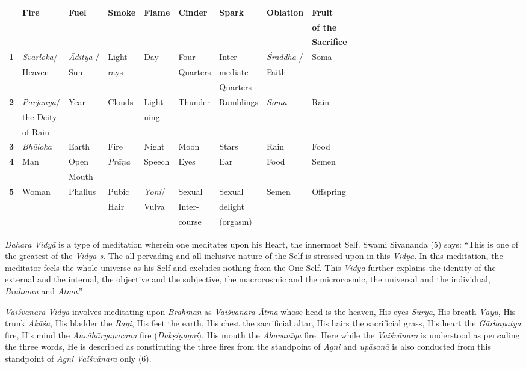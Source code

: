\small\addtolength{\tabcolsep}{-5pt}
\begin{longtable}{|l|l|l|l|l|l|l|l|l|}
\hline
 & \textbf{Fire} & \textbf{Fuel} & \textbf{Smoke} & \textbf{Flame} & \textbf{Cinder} & \textbf{Spark} & \textbf{Oblation} & \textbf{Fruit}\tabularnewline
 & & & & & & & &\textbf{of the}\tabularnewline
 & & & & & & & &\textbf{Sacrifice}\tabularnewline
\hline
\textbf{1} & \emph{Svarloka}/ & \emph{Āditya} / & Light- & Day & Four- & Inter- & \emph{Śraddhā} /  & Soma\tabularnewline
& Heaven & Sun & rays & & Quarters & mediate & Faith &\tabularnewline
&  &  &  & &  & Quarters &  &\tabularnewline
\hline
\textbf{2} & \emph{Parjanya}/ & Year & Clouds & Light- & Thunder & Rumblings & \emph{Soma} & Rain\tabularnewline
& the Deity &  &  & ning &  &  &  &\tabularnewline
& of Rain &  &  &  &  &  &  & \tabularnewline
\hline
\textbf{3} & \emph{Bhūloka} & Earth & Fire & Night & Moon & Stars & Rain & Food\tabularnewline
\hline
\textbf{4} & Man & Open & \emph{Prāṇa} & Speech & Eyes & Ear & Food & Semen\tabularnewline
& & Mouth &  &  &  &  &  &\tabularnewline
\hline
\textbf{5} & Woman & Phallus & Pubic & \emph{Yoni}/ & Sexual & Sexual  & Semen & Offspring\tabularnewline
&  &  & Hair & Vulva & Inter- & delight &  &\tabularnewline
& &  &  &  & course & (orgasm) &  &\tabularnewline
\hline
\end{longtable}

\emph{Dahara} \emph{Vidyā} is a type of meditation wherein one meditates upon his Heart, the innermost Self. Swami Sivananda (5) says: ``This is one of the greatest of the \emph{Vidyā-s}. The all-pervading and all-inclusive nature of the Self is stressed upon in this \emph{Vidyā}. In this meditation, the meditator feels the whole universe as his Self and excludes nothing from the One Self. This \emph{Vidyā} further explains the identity of the external and the internal, the objective and the subjective, the macrocosmic and the microcosmic, the universal and the individual, \emph{Brahman} and \emph{Ātma}.''

\emph{Vaiśvānara} \emph{Vidyā} involves meditating upon \emph{Brahman} as \emph{Vaiśvānara} \emph{Ātma} whose head is the heaven, His eyes \emph{Sūrya}, His breath \emph{Vāyu}, His trunk \emph{Akāśa}, His bladder the \emph{Rayi}, His feet the earth, His chest the sacrificial altar, His hairs the sacrificial grass, His heart the \emph{Gārhapatya} fire, His mind the \emph{Anvāhāryapacana} fire (\emph{Dakṣiṇagni}), His mouth the \emph{Āhavanīya} fire. Here while the \emph{Vaiśvānara} is understood as pervading the three words, He is described as constituting the three fires from the standpoint of \emph{Agni} and \emph{upāsanā} is also conducted from this standpoint of \emph{Agni} \emph{Vaiśvānara} only (6).

